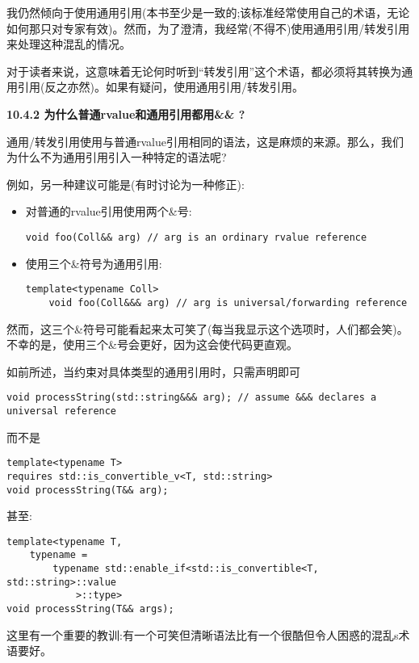 我仍然倾向于使用通用引用(本书至少是一致的;该标准经常使用自己的术语，无论如何那只对专家有效)。然而，为了澄清，我经常(不得不)使用通用引用/转发引用来处理这种混乱的情况。\par

对于读者来说，这意味着无论何时听到“转发引用”这个术语，都必须将其转换为通用引用(反之亦然)。如果有疑问，使用通用引用/转发引用。\par

\hspace*{\fill} \par %
\textbf{10.4.2 为什么普通rvalue和通用引用都用\&\& ?}

通用/转发引用使用与普通rvalue引用相同的语法，这是麻烦的来源。那么，我们为什么不为通用引用引入一种特定的语法呢?\par

例如，另一种建议可能是(有时讨论为一种修正):\par

\begin{itemize}
	\item 对普通的rvalue引用使用两个\&号:
	\begin{lstlisting}[caption={}]
	void foo(Coll&& arg) // arg is an ordinary rvalue reference
	\end{lstlisting}
	\item 使用三个\&符号为通用引用:
	\begin{lstlisting}[caption={}]
	template<typename Coll>
	void foo(Coll&&& arg) // arg is universal/forwarding reference
	\end{lstlisting}
\end{itemize}

然而，这三个\&符号可能看起来太可笑了(每当我显示这个选项时，人们都会笑)。不幸的是，使用三个\&号会更好，因为这会使代码更直观。\par

如前所述，当约束对具体类型的通用引用时，只需声明即可\par

\begin{lstlisting}[caption={}]
void processString(std::string&&& arg); // assume &&& declares a universal reference
\end{lstlisting}

而不是\par

\begin{lstlisting}[caption={}]
template<typename T>
requires std::is_convertible_v<T, std::string>
void processString(T&& arg);
\end{lstlisting}

甚至:\par

\begin{lstlisting}[caption={}]
template<typename T,
	typename =
		typename std::enable_if<std::is_convertible<T, std::string>::value
			>::type>
void processString(T&& args);
\end{lstlisting}

这里有一个重要的教训:有一个可笑但清晰语法比有一个很酷但令人困惑的混乱s术语要好。\par

















